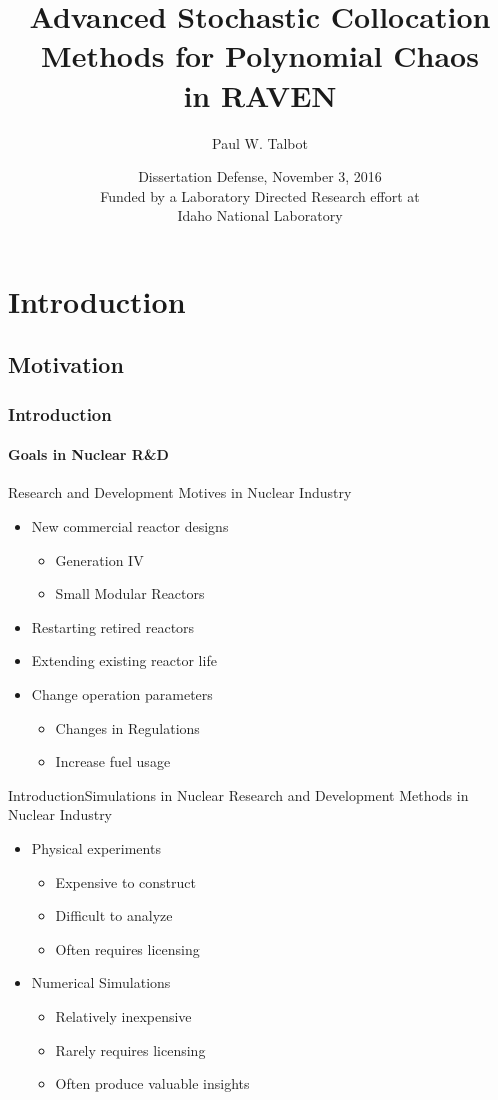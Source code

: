 \documentclass{beamer}
\title[Advanced UQ in RAVEN] %
{Advanced Stochastic Collocation \\Methods for Polynomial Chaos\\ in RAVEN}
\author[Talbot] %
{Paul W. Talbot}%
\institute[University of New Mexico] %
{
  University of New Mexico%
}
\date[Nov. 3 2016] %
{Dissertation Defense, November 3, 2016\\\vspace{10pt}\small Funded by a Laboratory Directed Research effort
at \\Idaho National Laboratory}
\begin{document}
\begin{frame}
  \titlepage
\end{frame}


\section{Introduction}
\subsection{Motivation}
\begin{frame}
  \frametitle{Introduction}
  \framesubtitle{Goals in Nuclear R\&D}\vspace{-20pt}
  \vfill
  Research and Development Motives in Nuclear Industry
  \vfill
  \begin{itemize}
    \item New commercial reactor designs
      \begin{itemize}
        \item Generation IV
        \item Small Modular Reactors
      \end{itemize}
  \vfill
    \item Restarting retired reactors
  \vfill
    \item Extending existing reactor life
  \vfill
    \item Change operation parameters
      \begin{itemize}
        \item Changes in Regulations
        \item Increase fuel usage
      \end{itemize}
  \end{itemize}
  \vfill
\end{frame}

\begin{frame}{Introduction}{Simulations in Nuclear}\vspace{-20pt}
  \vfill
  Research and Development Methods in Nuclear Industry
  \vfill
  \begin{itemize}
    \item Physical experiments
      \begin{itemize}
        \item Expensive to construct
        \item Difficult to analyze
        \item Often requires licensing
      \end{itemize}
  \vfill
    \item Numerical Simulations
      \begin{itemize}
        \item Relatively inexpensive
        \item Rarely requires licensing
        \item Often produce valuable insights
      \end{itemize}
  \end{itemize}
  \vfill
\end{frame}
\end{document}
